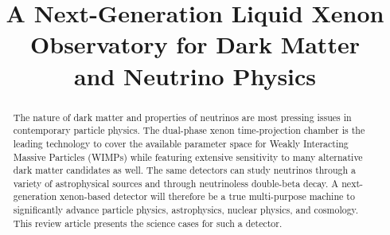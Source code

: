 \documentclass[aps,amsmath,amssymb,floatfix,preprintnumbers,rmp,showkeys,superscriptaddress,twocolumn]{revtex4-2}
\newcommand{\1}[1]{\, \mathrm{#1}} %
\begin{document}
\title{A Next-Generation Liquid Xenon Observatory for Dark Matter \\and Neutrino Physics}


\begin{abstract}
The nature of dark matter and properties of neutrinos are most pressing issues in contemporary particle physics. The dual-phase xenon time-projection chamber is the leading technology to cover the available parameter space for Weakly Interacting Massive Particles (WIMPs) while featuring extensive sensitivity to many alternative dark matter candidates as well. The same detectors can study neutrinos through a variety of astrophysical sources and through neutrinoless double-beta decay. A next-generation xenon-based detector will therefore be a true multi-purpose machine to significantly advance particle physics, astrophysics, nuclear physics, and cosmology. This review article presents the science cases for such a detector.
\end{abstract}


\maketitle

\tableofcontents
\linenumbers
















\end{document}
